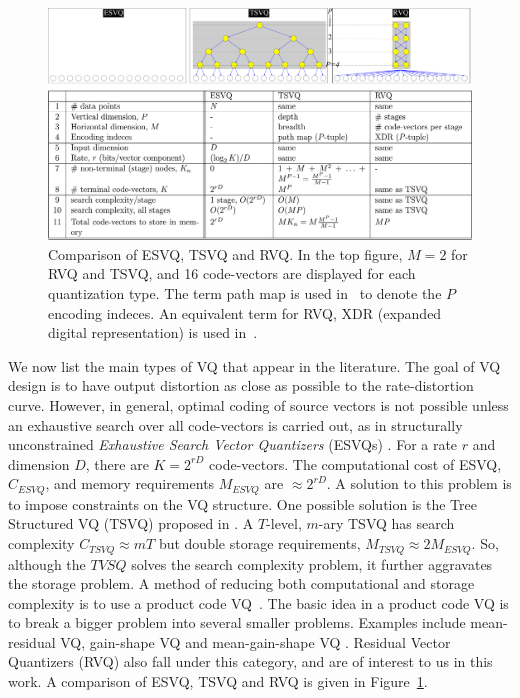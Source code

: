 \begin{Body}
								\begin{figure}[t]				
								\includegraphics[width=1.1\textwidth]{thesis/RVQ_comparisonWithESVQ_TSVQ.pdf}
								\caption{Comparison of ESVQ, TSVQ and RVQ.  In the top figure, $M=2$ for RVQ and TSVQ, and 16 code-vectors are displayed for each quantization type.  The term path map is used in~\cite{1991_BOOK_VQ_GershoGray} to denote the $P$ encoding indeces.  An equivalent term for RVQ, XDR (expanded digital representation) is used in~\cite{2007_JNL_IDDM_Barnes}.}
								\label{fig:comparison_ESVQ_TSVQ_RVQ}
								\end{figure}


We now list the main types of VQ that appear in the literature.  The goal of VQ design is to have output distortion as close as possible to the rate-distortion curve.  However, in general, optimal coding of source vectors is not possible unless an exhaustive search over all code-vectors is carried out, as in structurally unconstrained \emph{Exhaustive Search Vector Quantizers} (ESVQs) \cite{1992_JNL_RVQ_Barnes}.  For a rate $r$ and dimension $D$, there are $K=2^{rD}$ code-vectors.  The computational cost of ESVQ, $C_{ESVQ}$, and memory requirements $M_{ESVQ}$ are $\approx 2^{rD}$.  A solution to this problem is to impose constraints on the VQ structure.  One possible solution is the Tree Structured VQ (TSVQ) proposed in \cite{1980_JNL_TSVQ_Buzo}.  A $T$-level, $m$-ary TSVQ has search complexity $C_{TSVQ} \approx mT$ but double storage requirements, $M_{TSVQ} \approx 2 M_{ESVQ}$.   So, although the $TVSQ$ solves the search complexity problem, it further aggravates the storage problem.  A method of reducing both computational and storage complexity is to use a product code VQ~\cite{1991_BOOK_VQ_GershoGray}.  The basic idea in a product code VQ is to break a bigger problem into several smaller problems.  Examples include mean-residual VQ, gain-shape VQ and mean-gain-shape VQ \cite{1996_JNL_AdvancesRVQ_Barnes}.  Residual Vector Quantizers (RVQ) also fall under this category, and are of interest to us in this work.  A comparison of ESVQ, TSVQ and RVQ is given in Figure~\ref{fig:comparison_ESVQ_TSVQ_RVQ}.


\end{Body}
